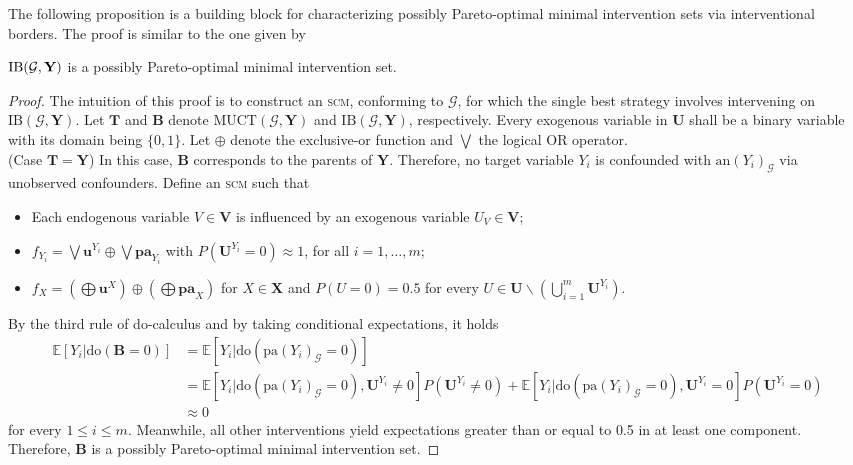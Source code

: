 The following proposition is a building block for characterizing possibly Pareto-optimal minimal intervention sets via interventional borders. The proof is similar to the one given by \citet{NEURIPS2018_c0a271bc} 

\begin{proposition}
    \label{prop:causal_bandits_IB}
    $\textnormal{IB}(\mathcal{G},\mathbf{Y})$ is a possibly Pareto-optimal minimal intervention set.
\end{proposition}

\begin{proof}
    The intuition of this proof is to construct an \textsc{scm}, conforming to $\mathcal{G}$, for which the single best strategy involves intervening on $\text{IB}(\mathcal{G},\mathbf{Y})$. Let $\mathbf{T}$ and $\mathbf{B}$ denote $\text{MUCT}(\mathcal{G},\mathbf{Y})$ and $\text{IB}(\mathcal{G},\mathbf{Y})$, respectively. Every exogenous variable in $\mathbf{U}$ shall be a binary variable with its domain being $\{ 0, 1\}$. Let $\oplus$ denote the exclusive-or function and $\bigvee$ the logical OR operator.
    \vspace{0.2cm}\\
    (Case $\mathbf{T} = \mathbf{Y}$) 
    In this case, $\mathbf{B}$ corresponds to the parents of $\mathbf{Y}$. Therefore, no target variable $Y_i$ is confounded with $\text{an}(Y_i)_{\mathcal{G}}$ via unobserved confounders. Define an \textsc{scm} such that
    \begin{itemize}
        \item Each endogenous variable $V \in \mathbf{V}$ is influenced by an exogenous variable $U_V \in \mathbf{V}$;
        \item $f_{Y_i} = \bigvee \mathbf{u}^{Y_i} \oplus \bigvee \mathbf{pa}_{Y_i}$ with $P(\mathbf{U}^{Y_i}=0) \approx 1$, for all $i=1,\dots,m$;
        \item $f_{X} = (\bigoplus \mathbf{u}^X) \oplus (\bigoplus \mathbf{pa}_X)$ for $X \in \mathbf{X}$ and $P(U = 0) = 0.5$ for every $U \in \mathbf{U} \backslash (\bigcup_{i=1}^m \mathbf{U}^{Y_i})$. 
    \end{itemize}
    By the third rule of do-calculus and by taking conditional expectations, it holds 
    \begin{align}
        \mathbb{E}[Y_i | \text{do}(\mathbf{B}=0)] &= \mathbb{E}[Y_i | \text{do}(\text{pa}({Y_i})_{\mathcal{G}}=0)] \\
        &= \mathbb{E}[Y_i | \text{do}(\text{pa}({Y_i})_{\mathcal{G}}=0), \mathbf{U}^{Y_i}\neq0] P(\mathbf{U}^{Y_i}\neq0) + \mathbb{E}[Y_i | \text{do}(\text{pa}({Y_i})_{\mathcal{G}}=0), \mathbf{U}^{Y_i}=0] P(\mathbf{U}^{Y_i}=0)\\
        &\approx 0
    \end{align}
    for every $1 \leq i \leq m$. Meanwhile, all other interventions yield expectations greater than or equal to 0.5 in at least one component. Therefore, $\mathbf{B}$ is a possibly Pareto-optimal minimal intervention set.
 

\end{proof}

